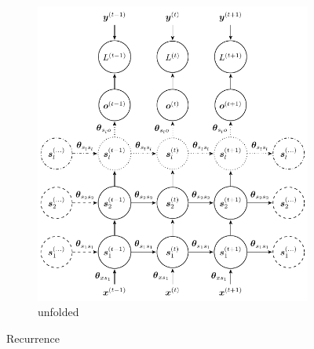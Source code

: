 \begin{figure}[H]
\begin{subfigure}[]{.79\textwidth}
\begin{center}
    \includegraphics[]{figs/rnn_uf.pdf}
    \end{center}
    \caption{unfolded}
    \label{fig:rnn_uf}
  \end{subfigure}
  \caption{Recurrence}
  \label{fig:rnn}
\end{figure}

